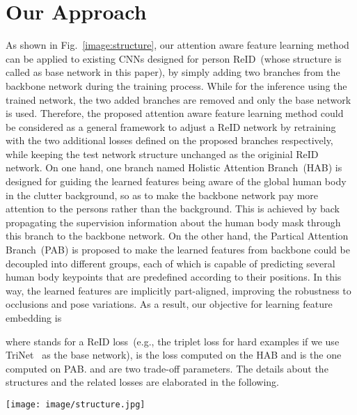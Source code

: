 \documentclass[10pt,twocolumn,letterpaper]{article}
\begin{document}
\section{Our Approach}

As shown in Fig.~\ref{image:structure}, our attention aware feature learning method can be applied to existing CNNs designed for person ReID~(whose structure is called as base network in this paper), by simply adding two branches from the backbone network during the training process. While for the inference using the trained network, the two added branches are removed and only the base network is used. Therefore, the proposed attention aware feature learning method could be considered as a general framework to adjust a ReID network by retraining with the two additional losses defined on the proposed branches respectively, while keeping the test network structure unchanged as the originial ReID network. On one hand, one branch named Holistic Attention Branch~(HAB) is designed for guiding the learned features being aware of the global human body in the clutter background, so as to make the backbone network pay more attention to the persons rather than the background. This is achieved by back propagating the supervision information about the human body mask through this branch to the backbone network. On the other hand, the Partical Attention Branch~(PAB) is proposed to make the learned features from backbone could be decoupled into different groups, each of which is capable of predicting several human body keypoints that are predefined according to their positions. In this way, the learned features are implicitly part-aligned, improving the robustness to occlusions and pose variations. As a result, our objective for learning feature embedding is

where  stands for a ReID loss~(e.g., the triplet loss for hard examples if we use TriNet~\cite{hermans2017defense} as the base network),  is the loss computed on the HAB and  is the one computed on PAB.  and  are two trade-off parameters. The details about the structures and the related losses are elaborated in the following. 

\begin{figure*}[t]
	\vspace{-3mm}
	\begin{center}
		\begin{minipage}[t]{0.7\linewidth}
\texttt{[image: image/structure.jpg]}
		\end{minipage}
	\end{center}
	\vspace{-3mm}
	\caption{Structure of the proposed deep attention aware feature learning for person ReID. Our method adds two branches from the backbone network at training stage so as to guide the backbone being able to learn global and local attention aware features. The \emph{PAB} forces the separated groups of feature channels focus on predefined body parts by predicting their corresponding keypoints. The \emph{HAB} branch predicts the mask of a person and restricts the backbone network to focus on person bodies instead of background. PAB and HAB do not influence the testing stage.
	}
	\label{image:structure}
\end{figure*}
\end{document}
